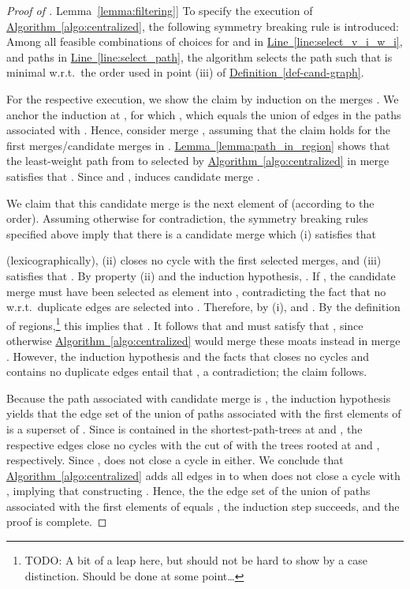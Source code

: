 \documentclass[letterpaper,11pt]{article}
\newcommand{\namedref}[2]{\hyperref[#2]{#1~\ref*{#2}}}
\newcommand{\defref}[1]{\namedref{Definition}{#1}}
\newcommand{\lemmaref}[1]{\namedref{Lemma}{#1}}
\newcommand{\algref}[1]{\namedref{Algorithm}{#1}}
\newcommand{\lineref}[1]{\namedref{Line}{#1}}
\begin{document}
\begin{proof}[Proof of \lemmaref{lemma:filtering}]
To specify the execution of \algref{algo:centralized}, the following symmetry
breaking rule is introduced: Among all feasible combinations of choices for
 and  in \lineref{line:select_v_i_w_i}, and paths  in
\lineref{line:select_path}, the algorithm selects the path  such
that  is minimal w.r.t.\ the order used in point (iii) of
\defref{def-cand-graph}.

For the respective execution, we show the claim by induction on the merges .
We anchor the induction at , for which , which equals the
union of edges in the paths associated with . Hence, consider merge
, assuming that the claim holds for the first 
merges/candidate merges in . \lemmaref{lemma:path_in_region} shows that the
least-weight path  from  to  selected by
\algref{algo:centralized} in merge  satisfies that . Since  and
,  induces candidate merge
.

We claim that this candidate merge is the next element of  (according to
the order). Assuming otherwise for contradiction, the symmetry breaking rules
specified above imply that there is a candidate merge
 which (i) satisfies that

(lexicographically), (ii) closes no cycle with the first  selected merges,
and (iii) satisfies that . By property (ii) and the
induction hypothesis, . If , the candidate merge
must have been selected as element  into , contradicting the
fact that no w.r.t.\  duplicate edges are selected into . Therefore,
by (i),  and . By the definition of regions,\footnote{TODO: A bit of a leap
here, but should not be hard to show by a case distinction. Should be done at
some point\ldots} this implies that .
It follows that  and  must satisfy that , since otherwise
\algref{algo:centralized} would merge these moats instead in merge . However,
the induction hypothesis and the facts that  closes no cycles and contains
no duplicate edges entail that , a contradiction; the claim
follows.

Because the path associated with candidate merge
 is
, the induction hypothesis yields that the edge set of the union
of paths associated with the first  elements of  is a superset of .
Since  is contained in the shortest-path-trees at
 and , the respective edges close no cycles with the cut of 
with the trees rooted at  and , respectively. Since ,  does not close a cycle in  either. We conclude that
\algref{algo:centralized} adds all edges in  to  when
 does not close a cycle with , implying that
constructing . Hence, the the edge set of the union of paths associated
with the first  elements of  equals , the induction step succeeds,
and the proof is complete.
\end{proof}
\end{document}
